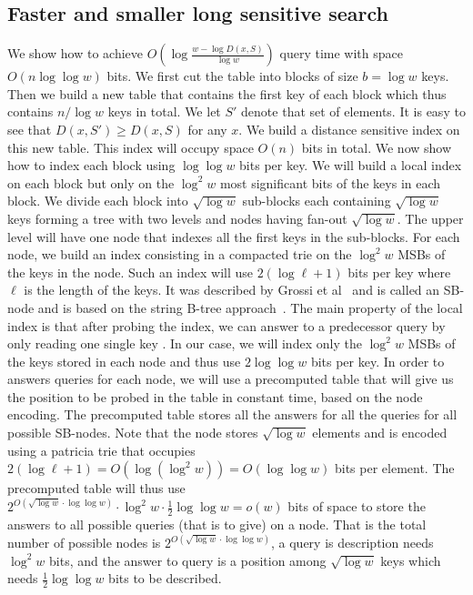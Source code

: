 \documentclass[a4paper,11pt]{article}
\newcommand{\?}{\mskip1.5mu}
\begin{document}
\subsection{Faster and smaller long sensitive search}
We show how to achieve $O(\log\frac{w-\log D(x,S)}{\log w})$ query time with space $O(n\log\log w)$ bits. 
We first cut the table into blocks of size $b=\log w$ keys. Then we build a new table that contains the first key of each block which thus contains $n/\log w$ keys in total. We let $S'$ denote that set of elements. It is easy to see that $D(x,S')\geq D(x,S)$ for any $x$. 
We build a distance sensitive index on this new table. This index will occupy space $O(n)$ bits in total. We now show how to index each block using $\log\log w$ bits per key. We will build a local index on each block but only on the $\log^2 w$ most significant bits of the keys in each block. We divide each block into $\sqrt{\log w}$ sub-blocks each containing $\sqrt{\log w}$ keys forming a tree with two levels and nodes having fan-out $\sqrt{\log w}$. The upper level will have one node that indexes all the first keys in the sub-blocks. For each node, we build an index consisting in a compacted trie on the $\log^2 w$ MSBs of the keys in the node. Such an index will use $2(\log\ell+1)$ bits per key where $\ell$ is the length of the keys. It was described by Grossi et al~\cite{GRR09} and is called an SB-node and is based on the string B-tree approach~\cite{FG99}. The main property of the local index is that after probing the index, we can answer to a predecessor query by only reading one single key . In our case, we will index only the $\log^2 w$ MSBs of the keys stored in each node and thus use $2\log\log w$ bits per key. In order to answers queries for each node, we will use a precomputed table that will give us the position to be probed in the table in constant time, based on the node encoding. The precomputed table stores all the answers for all the queries for all possible SB-nodes. Note that the node stores $\sqrt{\log w}$ elements and is encoded using a patricia trie that occupies $2(\log\ell+1)=O(\log(\log^2w))=O(\log\log w)$ bits per element. The precomputed table will thus use $2^{O(\sqrt{\log w}\cdot \log\log w)}\cdot\log^2w\cdot\frac{1}{2}\log\log w=o(w)$ bits of space to store the answers to all possible queries (that is to give) on a node. That is the total number of possible nodes is  $2^{O(\sqrt{\log w}\cdot \log\log w)}$, a query is description needs $\log^2w$ bits,  and the answer to query is a position among $\sqrt{\log w}$ keys which needs $\frac{1}{2}\log\log w$ bits to be described.
\end{document}
